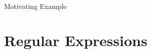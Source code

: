 \documentclass[10pt]{beamer}
\begin{document}
\begin{frame}{Motivating Example}
  \begin{center}
  \end{center}
\end{frame}

\section{Regular Expressions}
\end{document}
